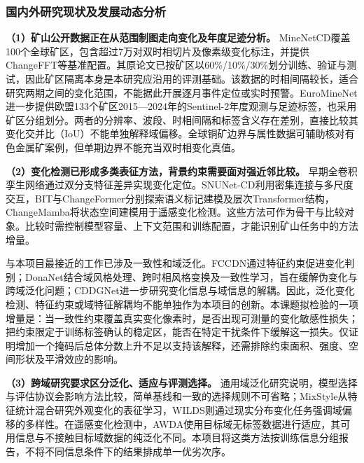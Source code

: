 \subsubsection{国内外研究现状及发展动态分析}
\textbf{（1）矿山公开数据正在从范围制图走向变化及年度足迹分析。}
MineNetCD覆盖100个全球矿区，包含超过7万对双时相切片及像素级变化标注，并提供ChangeFFT等基准配置。其原论文已按矿区以60\%/10\%/30\%划分训练、验证与测试\cite{Yu2024MineNetCD}，因此矿区隔离本身是本研究应沿用的评测基础。该数据的时相间隔较长，适合研究两期之间的变化范围，不能据此开展逐月事件定位或实时预警。EuroMineNet进一步提供欧盟133个矿区2015—2024年的Sentinel-2年度观测与足迹标签，也采用矿区分组划分\cite{Yu2026EuroMineNet}。两者的分辨率、波段、时相间隔和标签含义存在差别，直接比较其变化交并比（IoU）不能单独解释域偏移。全球铜矿边界与属性数据可辅助核对有色金属矿案例\cite{Li2025Copper}，但单期边界不能充当双时相变化真值。

\textbf{（2）变化检测已形成多类表征方法，背景约束需要面对强近邻比较。}
早期全卷积孪生网络通过双分支特征差异实现变化定位\cite{Daudt2018Siamese}。SNUNet-CD利用密集连接与多尺度交互\cite{Fang2022SNUNet}，BIT与ChangeFormer分别探索语义标记建模及层次Transformer结构\cite{Chen2022BIT,Bandara2022ChangeFormer}，ChangeMamba将状态空间建模用于遥感变化检测\cite{Chen2024ChangeMamba}。这些方法可作为骨干与比较对象。比较时需控制模型容量、上下文范围和训练配置，才能识别矿山任务中的方法增量。

与本项目最接近的工作已涉及一致性和域泛化。FCCDN通过特征约束促进变化判别\cite{Chen2022FCCDN}；DonaNet结合域风格处理、跨时相风格变换及一致性学习，旨在缓解伪变化与跨域泛化问题\cite{Zang2025DonaNet}；CDDGNet进一步研究变化信息与域信息的解耦\cite{Zhao2026CDDG}。因此，泛化变化检测、特征约束或域特征解耦均不能单独作为本项目的创新。本课题拟检验的一项增量是：当一致性约束覆盖真实变化像素时，是否出现可测量的变化敏感性损失；把约束限定于训练标签确认的稳定区，能否在特定干扰条件下缓解这一损失。仅证明增加一个掩码后总体分数上升不足以支持该解释，还需排除约束面积、强度、空间形状及平滑效应的影响。

\textbf{（3）跨域研究要求区分泛化、适应与评测选择。}
通用域泛化研究说明，模型选择与评估协议会影响方法比较，简单基线和一致的选择规则不可省略\cite{Gulrajani2021DomainBed}；MixStyle从特征统计混合研究外观变化的表征学习\cite{Zhou2021MixStyle}，WILDS则通过现实分布变化任务强调域偏移的多样性\cite{Koh2021WILDS}。在遥感变化检测中，AWDA使用目标域无标签数据进行适应\cite{AWDA2025}，其可用信息与不接触目标域数据的纯泛化不同。本项目将这类方法按训练信息分组报告，不将不同信息条件下的结果排成单一优劣次序。

